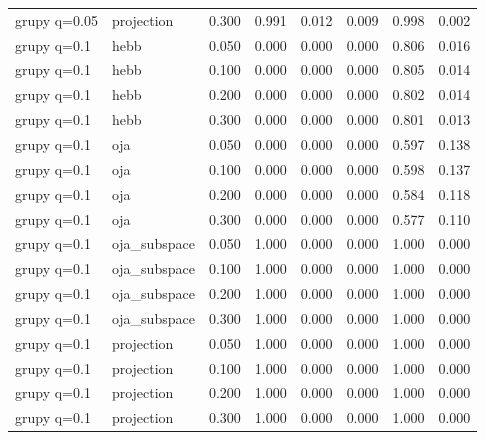 \begin{tabular}{llrrrrrr}
grupy q=0.05 & projection & 0.300 & 0.991 & 0.012 & 0.009 & 0.998 & 0.002 \\

grupy q=0.1 & hebb & 0.050 & 0.000 & 0.000 & 0.000 & 0.806 & 0.016 \\

grupy q=0.1 & hebb & 0.100 & 0.000 & 0.000 & 0.000 & 0.805 & 0.014 \\

grupy q=0.1 & hebb & 0.200 & 0.000 & 0.000 & 0.000 & 0.802 & 0.014 \\

grupy q=0.1 & hebb & 0.300 & 0.000 & 0.000 & 0.000 & 0.801 & 0.013 \\

grupy q=0.1 & oja & 0.050 & 0.000 & 0.000 & 0.000 & 0.597 & 0.138 \\

grupy q=0.1 & oja & 0.100 & 0.000 & 0.000 & 0.000 & 0.598 & 0.137 \\

grupy q=0.1 & oja & 0.200 & 0.000 & 0.000 & 0.000 & 0.584 & 0.118 \\

grupy q=0.1 & oja & 0.300 & 0.000 & 0.000 & 0.000 & 0.577 & 0.110 \\

grupy q=0.1 & oja\_subspace & 0.050 & 1.000 & 0.000 & 0.000 & 1.000 & 0.000 \\

grupy q=0.1 & oja\_subspace & 0.100 & 1.000 & 0.000 & 0.000 & 1.000 & 0.000 \\

grupy q=0.1 & oja\_subspace & 0.200 & 1.000 & 0.000 & 0.000 & 1.000 & 0.000 \\

grupy q=0.1 & oja\_subspace & 0.300 & 1.000 & 0.000 & 0.000 & 1.000 & 0.000 \\

grupy q=0.1 & projection & 0.050 & 1.000 & 0.000 & 0.000 & 1.000 & 0.000 \\

grupy q=0.1 & projection & 0.100 & 1.000 & 0.000 & 0.000 & 1.000 & 0.000 \\

grupy q=0.1 & projection & 0.200 & 1.000 & 0.000 & 0.000 & 1.000 & 0.000 \\

grupy q=0.1 & projection & 0.300 & 1.000 & 0.000 & 0.000 & 1.000 & 0.000 \\


\end{tabular}
